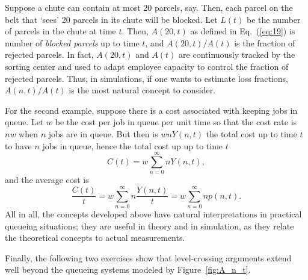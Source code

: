 Suppose a chute can contain at most 20 parcels, say. Then, each parcel
on the belt that `sees' 20 parcels in its chute will be blocked. Let
$L(t)$ be the number of parcels in the chute at time $t$. Then,
$A(20,t)$ as defined in Eq.~(\ref{eq:19}) is number of\emph{ blocked
  parcels} up to time $t$, and $A(20,t)/A(t)$ is the fraction of
rejected parcels. In fact, $A(20,t)$ and $A(t)$ are continuously
tracked by the sorting center and used to adapt employee capacity to
control the fraction of rejected parcels. Thus, in simulations, if one
wants to estimate loss fractions, $A(n,t)/A(t)$ is the most natural
concept to consider.

For the second example, suppose there is a cost associated with
keeping jobs in queue. Let $w$ be the cost per job in queue per unit
time so that the cost rate is $n w$ when $n$ jobs are in queue. But
then is $ wnY(n,t)$ the total cost up to time $t$ to have $n$ jobs in
queue, hence the total cost up up to time $t$
  \begin{equation*}
C(t) =     w \sum_{n=0}^\infty n Y(n,t),
  \end{equation*}
and the average cost is
\begin{equation*}
\frac{C(t)}t =    w \sum_{n=0}^\infty n \frac{Y(n,t)}t = w \sum_{n=0}^\infty n p(n,t).
\end{equation*}
All in all, the concepts developed above have natural interpretations
in practical queueing situations; they are useful in theory and in
simulation, as they relate the theoretical concepts to actual measurements.


Finally, the following two exercises show that level-crossing arguments extend well beyond the queueing systems modeled by Figure~\ref{fig:A_n_t}.

